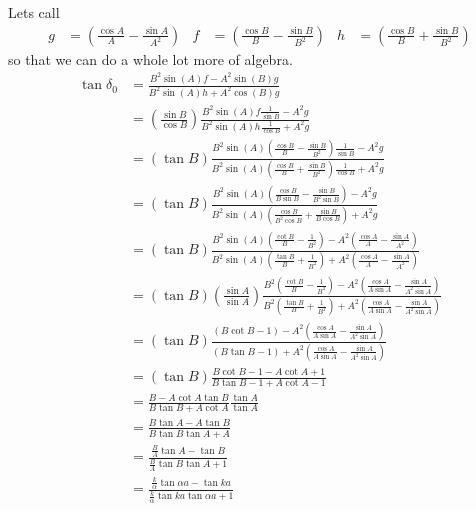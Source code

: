 \documentclass{jhwhw}
\begin{document}
Lets call
\begin{align}
	g &=  \left( \frac { \cos{A} } { A } - \frac {  \sin{A}  } {  A^2  } \right) & f &= \left( \frac{\cos{B}}{B} - \frac {\sin{B}}{B^2} \right) & h &= \left( \frac{\cos{B}}{B} + \frac {\sin{B}}{B^2} \right)
\end{align}
so that we can do a whole lot more of algebra.
\begin{align}
	\tan{\delta_0} &= \frac 
	{
	B^2 \sin{(A)} f - A^2 \sin{(B)} g
	}
	{
	B^2 \sin{(A)} h + A^2 \cos{(B)} g
	} 
	\\
	&= \left(\frac{\sin{B}}{\cos{B}}\right) \frac 
	{
	B^2 \sin{(A)} f \frac{1}{\sin{B}} - A^2 g
	}
	{
	B^2 \sin{(A)} h \frac{1}{\cos{B}} + A^2 g
	}
	\\
	&= \left(\tan{B}\right) \frac 
	{
	B^2 \sin{(A)} \left( \frac{\cos{B}}{B} - \frac {\sin{B}}{B^2} \right) \frac{1}{\sin{B}} - A^2 g
	}
	{
	B^2 \sin{(A)} \left( \frac{\cos{B}}{B} + \frac {\sin{B}}{B^2} \right) \frac{1}{\cos{B}} + A^2 g
	}
	\\	
	&= \left(\tan{B}\right) \frac 
	{
	B^2 \sin{(A)} \left( \frac{\cos{B}}{B \sin{B}} - \frac {\sin{B}}{B^2 \sin{B}} \right) - A^2 g
	}
	{
	B^2 \sin{(A)} \left( \frac{\cos{B}}{B^2 \cos{B}} + \frac {\sin{B}}{B \cos{B}} \right) + A^2 g
	}
	\\
	&= \left(\tan{B}\right) \frac 
	{
	B^2 \sin{(A)} \left( \frac{\cot{B}}{B} - \frac {1}{B^2} \right) - A^2 \left( \frac { \cos{A} } { A } - \frac {  \sin{A}  } {  A^2  } \right)
	}
	{
	B^2 \sin{(A)} \left(\frac {\tan{B}}{B} + \frac{1}{B^2} \right) + A^2 \left( \frac { \cos{A} } { A } - \frac {  \sin{A}  } {  A^2  } \right)
	}
	\\
	&= \left(\tan{B}\right) \left(\frac{\sin{A}}{\sin{A}}\right) \frac 
	{
	B^2 \left( \frac{\cot{B}}{B} - \frac {1}{B^2} \right) - A^2 \left( \frac { \cos{A} } { A \sin{A} } - \frac {  \sin{A}  } {  A^2 \sin{A}  } \right)
	}
	{
	B^2	\left(\frac {\tan{B}}{B} + \frac{1}{B^2} \right) + A^2 \left( \frac { \cos{A} } { A \sin{A} } - \frac {  \sin{A}  } {  A^2 \sin{A} } \right)
	}
	\\
	&= \left(\tan{B}\right) \frac 
	{
	\left( B \cot{B} - 1 \right) - A^2 \left( \frac { \cos{A} } { A \sin{A} } - \frac {  \sin{A}  } {  A^2 \sin{A}  } \right)
	}
	{
	\left( B \tan{B} - 1 \right) + A^2 \left( \frac { \cos{A} } { A \sin{A} } - \frac {  \sin{A}  } {  A^2 \sin{A} } \right)
	}
	\\
	&= \left(\tan{B}\right) \frac 
	{
	B \cot{B} - 1 - A \cot{A}+1
	}
	{
	B \tan{B} - 1 + A \cot{A} - 1
	}
	\\
	&= \frac 
	{
	B - A \cot{A}\tan{B}
	}
	{
	B \tan{B} + A \cot{A}
	} \frac{\tan{A}}{\tan{A}}
	\\
	&= \frac 
	{
	B \tan{A} - A \tan{B}
	}
	{
	B \tan{B}\tan{A} + A 
	}
	\\
	&= \frac 
	{
	\frac{B}{A} \tan{A} - \tan{B}
	}
	{
	\frac{B}{A} \tan{B}\tan{A} + 1 
	}
	\\
	\label{eq:tandelta2}
	&= \frac 
	{
	\frac{k}{\alpha} \tan{\alpha a} - \tan{k a}
	}
	{
	\frac{k}{\alpha} \tan{k a}\tan{\alpha a} + 1 
	}
\end{align}
\end{document}
